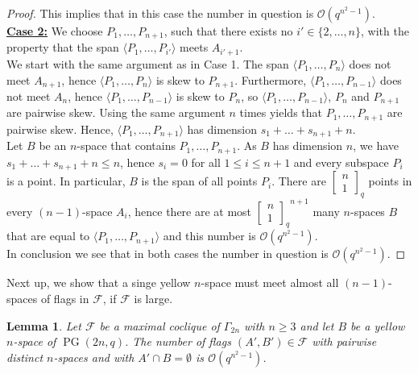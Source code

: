 \documentclass[11pt, oneside, a4paper]{article}
\newtheorem{lemma}[thm]{Lemma}
\newcommand{\EKR}{\mathcal{F}}
\newcommand{\OO}{\mathcal{O}}
\newcommand{\Gauss}[2]{{\begin{bmatrix} #1 \\ #2 \end{bmatrix}_q}}
\DeclareMathOperator{\PG}{PG}
\begin{document}
\begin{proof}
This implies that in this case the number in question is $\OO(q^{n^2-1})$.\\

\textbf{\underline{Case 2:}} We choose $P_1,\ldots,P_{n+1}$, such that there exists  no $i'\in \{2,\ldots,n\}$, with the property that the span $\langle P_1,\ldots,P_{i'} \rangle$ meets $A_{i'+1}$. \\

We start with the same argument as in Case 1. 
The span $\langle P_1,\ldots,P_{n} \rangle$ does not meet $A_{n+1}$, hence $\langle P_1,\ldots,P_{n} \rangle$ is skew to $P_{n+1}$. 
Furthermore, $\langle P_1,\ldots,P_{n-1} \rangle$ does not meet $A_{n}$, hence $\langle P_1,\ldots,P_{n-1} \rangle$ is skew to $P_{n}$, so $\langle P_1,\ldots,P_{n-1} \rangle$, $P_{n}$ and $P_{n+1}$ are pairwise skew. 
Using the same argument $n$ times yields that $P_1,\ldots,P_{n+1}$ are pairwise skew. Hence, 
$\langle P_1,\ldots,P_{n+1}\rangle$ has dimension $s_1+\ldots+s_{n+1}+n$.\\
Let $B$ be an $n$-space that contains $P_1,\ldots,P_{n+1}$.
As $B$ has dimension $n$, we have $s_1+\ldots+s_{n+1}+n\leq n$, hence $s_i=0$ for all $1\leq i\leq n+1$ and every subspace $P_i$ is a point. In particular, $B$ is the span of all points $P_i$. There are $\Gauss{n}{1}$ points in every $(n-1)$-space $A_i$, hence there are at most $\Gauss{n}{1}^{n+1}$ many $n$-spaces $B$ that are equal to $\langle P_1,\ldots,P_{n+1} \rangle$ and this number is $\mathcal{O}(q^{n^2-1})$.\\

In conclusion we see that in both cases the number in question is $\OO(q^{n^2-1})$.
\end{proof}






Next up, we show that a singe yellow $n$-space must meet almost all $(n-1)$-spaces of flags in $\EKR$, if $\EKR$ is large.

\begin{lemma} \label{L: yellows meet almost all}
    Let $\EKR$ be a maximal coclique of $\Gamma_{2n}$ with $n\geq 3$ and let $B$ be a yellow $n$-space of $\PG(2n,q)$. The number of flags $(A',B')\in \EKR$ with pairwise distinct $n$-spaces and with $A'\cap B=\emptyset$ is $\OO(q^{n^2-1})$.
\end{lemma}
\end{document}
